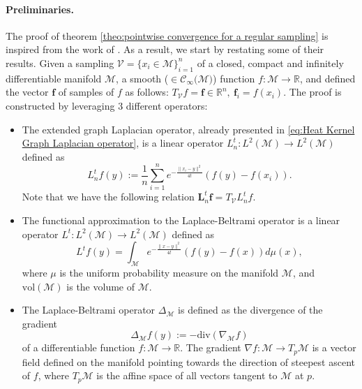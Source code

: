 \documentclass{article} %
\renewcommand{\b}[1]{{\bm{#1}}}  %
\newcommand{\R}{\mathbb{R}}
\newcommand{\V}{\mathcal{V}}  %
\begin{document}
\paragraph{Preliminaries.}
The proof of theorem \ref{theo:pointwise convergence for a regular sampling} is inspired from the work of \citet{belkin2005towards}. As a result, we start by restating some of their results.
Given a sampling $\V = \{x_i\in\mathcal M\}_{i=1}^n$ of a closed, compact and infinitely differentiable manifold $\mathcal{M}$, a smooth ($\in\mathcal{C}_\infty(\mathcal{M)}$) function  $f:\mathcal{M} \rightarrow \mathbb{R}$, and defined the vector $\b{f}$ of samples of $f$ as follows: $T_\V f = \b{f} \in \mathbb{R}^n,\ \b{f}_i = f(x_i)$.
The proof is constructed by leveraging 3 different operators:
\begin{itemize}
  \item The extended graph Laplacian operator, already presented in \eqref{eq:Heat Kernel Graph Laplacian operator}, is a linear operator $L_n^t: L^{2}(\mathcal{M}) \rightarrow L^{2}(\mathcal{M})$ defined as
	\begin{equation}
	 L_n^t f(y) := \frac{1}{n}\sum_{i=1}^{n} e^{ -\frac{\|x_i-y\|^2}{4t}} \left(f(y)-f(x_i)\right).
	\end{equation}
	Note that we have the following relation $\b{L}_n^t \b{f} = T_\V L_n^t f$.
	\item The functional approximation to the Laplace-Beltrami operator is a linear operator $L^t: L^{2}(\mathcal{M}) \rightarrow L^{2}(\mathcal{M})$ defined  as
	\begin{equation}
    \label{eq:Functional approximation to the Laplace-Beltrami operator}
	L^tf(y) = \int_{\mathcal{M}} e^{-\frac{\|x-y\|^2}{4t}}\left(f(y)-f(x)\right)d\mu(x),
	\end{equation}
	where $\mu$ is the uniform probability measure on the manifold $\mathcal{M}$, and $\text{vol}(\mathcal{M})$ is the volume of $\mathcal{M}$.
	\item
	The Laplace-Beltrami operator $\Delta_{\mathcal{M}}$ is defined as the divergence of the gradient
	\begin{equation}
        \label{eq:laplace-beltrami}
        \Delta_{\mathcal M}f(y) := -\text{div}(\nabla_{\mathcal M}f)
    \end{equation}
    of a differentiable function $f: \mathcal M\rightarrow \R$. The gradient $\nabla f: \mathcal M \rightarrow T_p\mathcal M$ is a vector field defined on the manifold pointing towards the direction of steepest ascent of $f$, where $T_p\mathcal M$ is the affine space of all vectors tangent to $\mathcal M$ at $p$.

\end{itemize}
\end{document}
